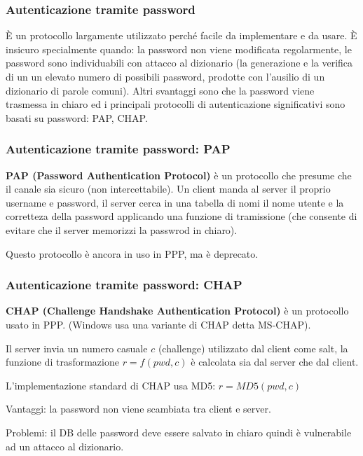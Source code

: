         \subsubsection{Autenticazione tramite password}
            È un protocollo largamente utilizzato perché facile da implementare e da usare. È insicuro specialmente quando: la password non viene modificata regolarmente, le password sono individuabili con attacco al dizionario (la generazione e la verifica di un un elevato numero di possibili password, prodotte con l'ausilio di un dizionario di parole comuni). Altri svantaggi sono che la password viene trasmessa in chiaro ed i principali protocolli di autenticazione significativi sono basati su password: PAP, CHAP.

        \subsubsection{Autenticazione tramite password: PAP}
            \textbf{PAP (Password Authentication Protocol)} è un protocollo che presume che il canale sia sicuro (non intercettabile). Un client manda al server il proprio username e password, il server cerca in una tabella di nomi il nome utente e la corretteza della password applicando una funzione di tramissione (che consente di evitare che il server memorizzi la passwrod in chiaro).
        
            Questo protocollo è ancora in uso in PPP, ma è deprecato.

        \subsubsection{Autenticazione tramite password: CHAP}
            \textbf{CHAP (Challenge Handshake Authentication Protocol)} è un protocollo usato in PPP. (Windows usa una variante di CHAP detta MS-CHAP).
        
            Il server invia un numero casuale $c$ (challenge) utilizzato dal client come salt, la funzione di trasformazione $r = f(pwd,c)$ è calcolata sia dal server che dal client.
        
            L'implementazione standard di CHAP usa MD5: $r = MD5(pwd,c)$
        
            Vantaggi: la password non viene scambiata tra client e server.
        
            Problemi: il DB delle password deve essere salvato in chiaro quindi è vulnerabile ad un attacco al dizionario.
        
